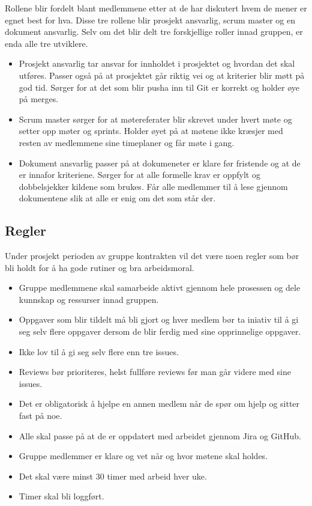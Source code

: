 Rollene blir fordelt blant medlemmene etter at de har diskutert hvem de mener er egnet best for hva. Disse tre rollene blir prosjekt ansvarlig, scrum master og en dokument ansvarlig. Selv om det blir delt tre forskjellige roller innad gruppen, er enda alle tre utviklere.

\begin{itemize}
    \item Prosjekt ansvarlig tar ansvar for innholdet i prosjektet og hvordan det skal utføres. Passer også på at prosjektet går riktig vei og at kriterier blir møtt på god tid. Sørger for at det som blir pusha inn til Git er korrekt og holder øye på merges.
    \item Scrum master sørger for at møtereferater blir skrevet under hvert møte og setter opp møter og sprints. Holder øyet på at møtene ikke kræsjer med resten av medlemmene sine timeplaner og får møte i gang.
    \item Dokument ansvarlig passer på at dokumeneter er klare før fristende og at de er innafor kriteriene. Sørger for at alle formelle krav er oppfylt og dobbelsjekker kildene som brukes. Får alle medlemmer til å lese gjennom dokumentene slik at alle er enig om det som står der.
\end{itemize}

\subsection{Regler}

Under prosjekt perioden av gruppe kontrakten vil det være noen regler som bør bli holdt for å ha gode rutiner og bra arbeidsmoral.

\begin{itemize}
    \item Gruppe medlemmene skal samarbeide aktivt gjennom hele prosessen og dele kunnskap og ressurser innad gruppen.
    \item Oppgaver som blir tildelt må bli gjort og hver medlem bør ta iniativ til å gi seg selv flere oppgaver dersom de blir ferdig med sine opprinnelige oppgaver.
    \item Ikke lov til å gi seg selv flere enn tre issues.
    \item Reviews bør prioriteres, helst fullføre reviews før man går videre med sine issues.
    \item Det er obligatorisk å hjelpe en annen medlem når de spør om hjelp og sitter fast på noe.
    \item Alle skal passe på at de er oppdatert med arbeidet gjennom Jira og GitHub.
    \item Gruppe medlemmer er klare og vet når og hvor møtene skal holdes.
    \item Det skal være minst 30 timer med arbeid hver uke.
    \item Timer skal bli loggført.
\end{itemize}

